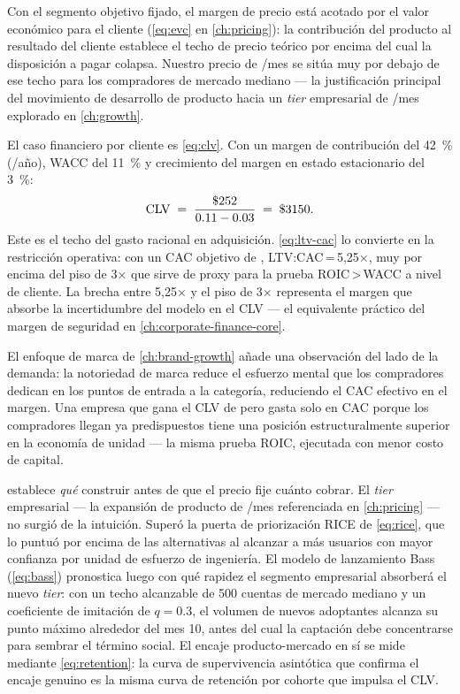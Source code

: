 Con el segmento objetivo fijado, el margen de precio está acotado por el valor económico para
el cliente (\cref{eq:evc} en \cref{ch:pricing}): la contribución del producto al resultado del
cliente establece el techo de precio teórico por encima del cual la disposición a pagar colapsa.
Nuestro precio de /mes se sitúa muy por debajo de ese techo para los compradores de
mercado mediano --- la justificación principal del movimiento de desarrollo de producto hacia un
\emph{tier} empresarial de /mes explorado en \cref{ch:growth}.

El caso financiero por cliente es \cref{eq:clv}. Con un margen de contribución del \qty{42}{\percent}
(/año), WACC del \qty{11}{\percent} y crecimiento del margen en estado estacionario del
\qty{3}{\percent}:
\[
  \mathrm{CLV} \;=\; \frac{\$\num{252}}{0.11 - 0.03} \;=\; \$\num{3150}.
\]
Este es el techo del gasto racional en adquisición. \cref{eq:ltv-cac} lo convierte en la
restricción operativa: con un CAC objetivo de , LTV:CAC\,=\,5,25×, muy por encima del
piso de 3× que sirve de proxy para la prueba ROIC\,>\,WACC a nivel de cliente. La brecha entre
5,25× y el piso de 3× representa el margen que absorbe la incertidumbre del modelo en el CLV ---
el equivalente práctico del margen de seguridad en \cref{ch:corporate-finance-core}.

El enfoque de marca de \cref{ch:brand-growth} añade una observación del lado de la demanda: la
notoriedad de marca reduce el esfuerzo mental que los compradores dedican en los puntos de
entrada a la categoría, reduciendo el CAC efectivo en el margen. Una empresa que gana el CLV de
 pero gasta solo  en CAC porque los compradores llegan ya predispuestos
tiene una posición estructuralmente superior en la economía de unidad --- la misma prueba ROIC,
ejecutada con menor costo de capital.

 establece \emph{qué} construir antes de que el precio fije cuánto
cobrar. El \emph{tier} empresarial --- la expansión de producto de /mes referenciada en
\cref{ch:pricing} --- no surgió de la intuición. Superó la puerta de priorización RICE de
\cref{eq:rice}, que lo puntuó por encima de las alternativas al alcanzar a más usuarios con mayor
confianza por unidad de esfuerzo de ingeniería. El modelo de lanzamiento Bass (\cref{eq:bass})
pronostica luego con qué rapidez el segmento empresarial absorberá el nuevo \emph{tier}: con un
techo alcanzable de 500 cuentas de mercado mediano y un coeficiente de imitación de \(q=0.3\),
el volumen de nuevos adoptantes alcanza su punto máximo alrededor del mes 10, antes del cual la
captación debe concentrarse para sembrar el término social. El encaje producto-mercado en sí
se mide mediante \cref{eq:retention}: la curva de supervivencia asintótica que confirma el
encaje genuino es la misma curva de retención por cohorte que impulsa el CLV.

